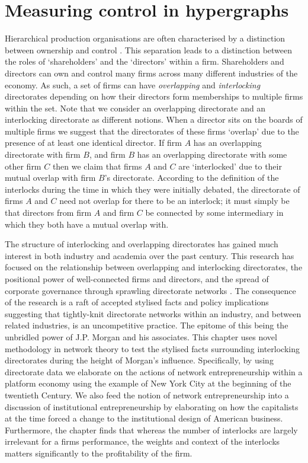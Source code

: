 \chapter{Measuring control in hypergraphs}
\label{ch:MeasuringHypergraphControl}

Hierarchical production organisations are often characterised by a distinction between ownership and control \citep{JensenMeckling1976, FamaJensen1983}. This separation leads to a distinction between the roles of `shareholders' and the `directors' within a firm. Shareholders and directors can own and control many firms across many different industries of the economy. As such, a set of firms can have \emph{overlapping} and \emph{interlocking} directorates depending on how their directors form memberships to multiple firms within the set. Note that we consider an overlapping directorate and an interlocking directorate as different notions. When a director sits on the boards of multiple firms we suggest that the directorates of these firms `overlap' due to the presence of at least one identical director. If firm $A$ has an overlapping directorate with firm $B$, and firm $B$ has an overlapping directorate with some other firm $C$ then we claim that firms $A$ and $C$ are `interlocked' due to their mutual overlap with firm $B$'s directorate. According to the definition of the interlocks during the time in which they were initially debated, the directorate of firms $A$ and $C$ need not overlap for there to be an interlock; it must simply be that directors from firm $A$ and firm $C$ be connected by some intermediary in which they both have a mutual overlap with.

The structure of interlocking and overlapping directorates has gained much interest in both industry and academia over the past century. This research has focused on the relationship between overlapping and interlocking directorates, the positional power of well-connected firms and directors, and the spread of corporate governance through sprawling directorate networks \citep{RoyBonacich1988}. The consequence of the research is a raft of accepted stylised facts and policy implications suggesting that tightly-knit directorate networks within an industry, and between related industries, is an uncompetitive practice. The epitome of this being the unbridled power of J.P. Morgan and his associates. This chapter uses novel methodology in network theory to test the stylised facts surrounding interlocking directorates during the height of Morgan's influence. Specifically, by using directorate data we elaborate on the actions of network entrepreneurship within a platform economy using the example of New York City at the beginning of the twentieth Century. We also feed the notion of network entrepreneurship into a discussion of institutional entrepreneurship by elaborating on how the capitalists at the time forced a change to the institutional design of American business. Furthermore, the chapter finds that whereas the number of interlocks are largely irrelevant for a firms performance, the weights and context of the interlocks matters significantly to the profitability of the firm.

